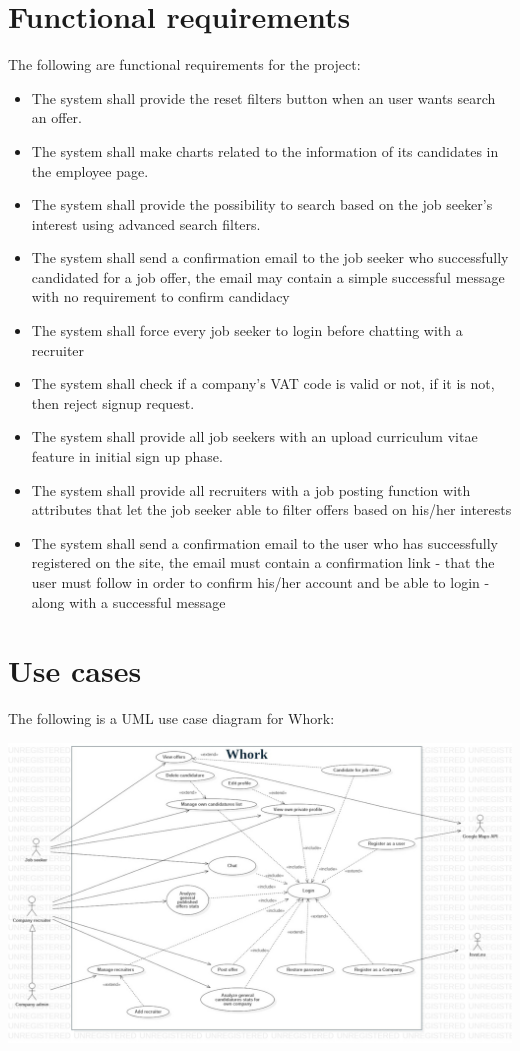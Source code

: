 \documentclass[12pt, a4paper]{article}
\begin{document}
\section{Functional requirements}
The following are functional requirements for the project:
\begin{itemize}
	\item The system shall provide the reset filters button when an user wants search an offer.                                                       
	\item The system shall make charts related to the information of its candidates in the employee page.                     
	\item The system shall provide the possibility to search based on the job seeker's interest using advanced search filters.
	\item The system shall send a confirmation email to the job seeker who successfully candidated for a job offer, 
		the email may contain a simple successful message with no requirement to confirm candidacy
	\item The system shall force every job seeker to login before chatting with a recruiter
	\item The system shall check if a company's VAT code is valid or not, if it is not, then reject signup request.
	\item The system shall provide all job seekers with an upload curriculum vitae feature in initial sign up phase.
	\item The system shall provide all recruiters with a job posting function with attributes that let the job seeker 
		able to filter offers based on his/her interests
	\item The system shall send a confirmation email to the user who has successfully registered on the site, 
		the email must contain a confirmation link - that the user must follow in order to confirm his/her account 
		and be able to login - along with a successful message
\end{itemize}

\section{Use cases}
The following is a UML use case diagram for Whork:

\begin{center}
	\includegraphics[scale=1.7]{diagrams/project/usecase/usecase_scaled.jpg}
\end{center}
\end{document}
